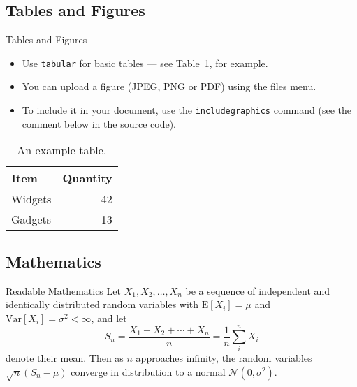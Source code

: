 \documentclass[10pt]{beamer}
\begin{document}
\subsection{Tables and Figures}
\begin{frame}{Tables and Figures}
  \begin{itemize}
    \item Use \texttt{tabular} for basic tables --- see Table~\ref{tab:widgets}, for example.
    \item You can upload a figure (JPEG, PNG or PDF) using the files menu.
    \item To include it in your document, use the \texttt{includegraphics} command (see the comment below in the source code).
  \end{itemize}


  \begin{table}
    \centering
    \begin{tabular}{l|r}
    Item & Quantity \\\hline
    Widgets & 42 \\
    Gadgets & 13
    \end{tabular}
    \caption{\label{tab:widgets}An example table.}
  \end{table}
\end{frame}

\subsection{Mathematics}
\begin{frame}{Readable Mathematics}
  Let $X_1, X_2, \ldots, X_n$ be a sequence of independent and identically distributed random variables with $\text{E}[X_i] = \mu$ and $\text{Var}[X_i] = \sigma^2 < \infty$, and let
  $$S_n = \frac{X_1 + X_2 + \cdots + X_n}{n}
        = \frac{1}{n}\sum_{i}^{n} X_i$$
  denote their mean. Then as $n$ approaches infinity, the random variables $\sqrt{n}(S_n - \mu)$ converge in distribution to a normal $\mathcal{N}(0, \sigma^2)$.
\end{frame}
\end{document}
